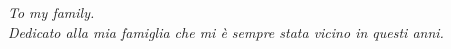 \documentclass[a4paper,titlepage,oneside,10pt]{book}
\begin{document}
\newpage
\thispagestyle{empty}
\newpage
\begin{center}
\textit{To my family.}\\
\textit{Dedicato alla mia famiglia che mi \`e sempre stata vicino in questi anni.}
\end{center}
\newpage
\thispagestyle{empty}
\null
\newpage
{}\setcounter{page}{1}
\tableofcontents
\mainmatter


\setcounter{page}{3}
\end{document}
